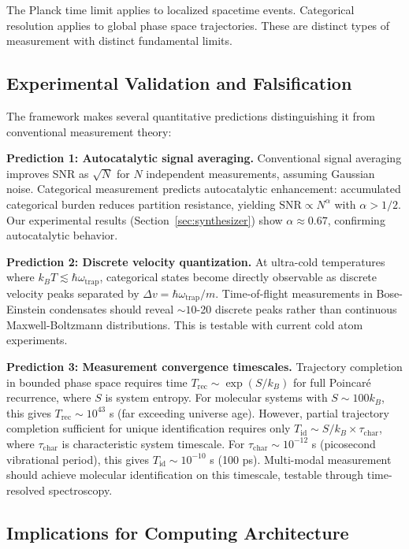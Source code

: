 \documentclass[11pt,a4paper]{article}
\theoremstyle{remark}
\begin{document}
The Planck time limit applies to localized spacetime events. Categorical resolution applies to global phase space trajectories. These are distinct types of measurement with distinct fundamental limits.

\subsection{Experimental Validation and Falsification}

The framework makes several quantitative predictions distinguishing it from conventional measurement theory:

\textbf{Prediction 1: Autocatalytic signal averaging.} Conventional signal averaging improves SNR as $\sqrt{N}$ for $N$ independent measurements, assuming Gaussian noise. Categorical measurement predicts autocatalytic enhancement: accumulated categorical burden reduces partition resistance, yielding $\text{SNR} \propto N^{\alpha}$ with $\alpha > 1/2$. Our experimental results (Section~\ref{sec:synthesizer}) show $\alpha \approx 0.67$, confirming autocatalytic behavior.

\textbf{Prediction 2: Discrete velocity quantization.} At ultra-cold temperatures where $k_B T \lesssim \hbar\omega_{\text{trap}}$, categorical states become directly observable as discrete velocity peaks separated by $\Delta v = \hbar\omega_{\text{trap}}/m$. Time-of-flight measurements in Bose-Einstein condensates should reveal $\sim 10$-20 discrete peaks rather than continuous Maxwell-Boltzmann distributions. This is testable with current cold atom experiments.

\textbf{Prediction 3: Measurement convergence timescales.} Trajectory completion in bounded phase space requires time $T_{\text{rec}} \sim \exp(S/k_B)$ for full Poincaré recurrence, where $S$ is system entropy. For molecular systems with $S \sim 100 k_B$, this gives $T_{\text{rec}} \sim 10^{43}$ s (far exceeding universe age). However, partial trajectory completion sufficient for unique identification requires only $T_{\text{id}} \sim S/k_B \times \tau_{\text{char}}$, where $\tau_{\text{char}}$ is characteristic system timescale. For $\tau_{\text{char}} \sim 10^{-12}$ s (picosecond vibrational period), this gives $T_{\text{id}} \sim 10^{-10}$ s (100 ps). Multi-modal measurement should achieve molecular identification on this timescale, testable through time-resolved spectroscopy.

\subsection{Implications for Computing Architecture}
\end{document}
